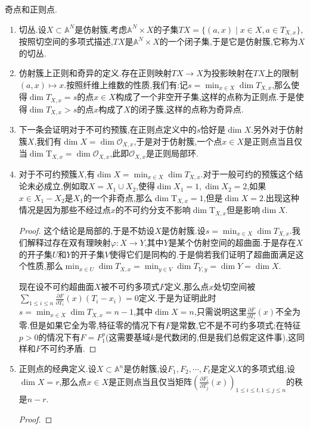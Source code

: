 奇点和正则点.
\begin{enumerate}
	\item 切丛.设$X\subset\mathbb{A}^N$是仿射簇,考虑$\mathbb{A}^N\times X$的子集$TX=\{(a,x)\mid x\in X,a\in T_{X,x}\}$,按照切空间的多项式描述,$TX$是$\mathbb{A}^N\times X$的一个闭子集,于是它是仿射簇,它称为$X$的切丛.
	\item 仿射簇上正则和奇异的定义.存在正则映射$TX\to X$为投影映射在$TX$上的限制$(a,x)\mapsto x$.按照纤维上维数的性质,我们有:记$s=\min_{x\in X}\dim T_{X,x}$,那么使得$\dim T_{X,x}=s$的点$x\in X$构成了一个非空开子集,这样的点称为正则点.于是使得$\dim T_{X,x}>s$的点$x$构成了$X$的闭子簇,这样的点称为奇异点.
	\item 下一条会证明对于不可约预簇,在正则点定义中的$s$恰好是$\dim X$.另外对于仿射簇$X$,我们有$\dim X=\dim\mathscr{O}_{X,x}$,于是对于仿射簇,一个点$x\in X$是正则点当且仅当$\dim\mathrm{T}_{X,x}=\dim\mathscr{O}_{X,x}$,此即$\mathscr{O}_{X,x}$是正则局部环.
	\item 对于不可约预簇$X$,有$\dim X=\min_{x\in X}\dim T_{X,x}$.对于一般可约的预簇这个结论未必成立,例如取$X=X_1\cup X_2$,使得$\dim X_1=1,\dim X_2=2$,如果$x\in X_1-X_2$是$X_1$的一个非奇点,那么$\dim\mathrm{T}_{X,x}=1$,但是$\dim X=2$.出现这种情况是因为那些不经过点$x$的不可约分支不影响$\dim\mathrm{T}_{X,x}$但是影响$\dim X$.
	\begin{proof}
		
		这个结论是局部的,于是不妨设$X$是仿射簇.设$s=\min_{x\in X}\dim T_{X,x}$.我们解释过存在双有理映射$\varphi:X\to Y$,其中$Y$是某个仿射空间的超曲面.于是存在$X$的开子集$U$和$Y$的开子集$V$使得它们是同构的.于是倘若我们证明了超曲面满足这个性质,那么$\min_{x\in U}\dim T_{X,x}=\min_{y\in V}\dim T_{Y,y}=\dim Y=\dim X$.
		
		\qquad
		
		现在设不可约超曲面$X$被不可约多项式$F$定义,那么点$x$处切空间被$\sum_{1\le i\le n}\frac{\partial F}{\partial T_i}(x)(T_i-x_i)=0$定义.于是为证明此时$s=\min_{x\in X}\dim T_{X,x}=n-1$,其中$\dim X=n$,只需说明这里$\frac{\partial F}{\partial T_i}(x)$不全为零.但是如果它全为零,特征零的情况下有$F$是常数,它不是不可约多项式;在特征$p>0$的情况下有$F=F_1^p$(这需要基域$k$是代数闭的,但是我们总假定这件事),这同样和$F$不可约矛盾.
	\end{proof}
	\item 正则点的经典定义.设$X\subset\mathbb{A}^n$是仿射簇,设$F_1,F_2,\cdots,F_t$是定义$X$的多项式组,设$\dim X=r$,那么点$x\in X$是正则点当且仅当矩阵$\left(\frac{\partial F_i}{\partial T_j}(x)\right)_{1\le i\le t,1\le j\le n}$的秩是$n-r$.
	\begin{proof}
		

\end{proof}
\end{enumerate}
